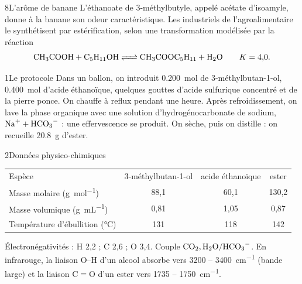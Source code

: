 

\begin{exoBac}{8}{L'arôme de banane}
L'éthanoate de 3-méthylbutyle, appelé acétate d'isoamyle, donne à la banane son odeur caractéristique. Les industriels
de l'agroalimentaire le synthétisent par estérification, selon une transformation modélisée par la réaction
\[\ce{CH3COOH + C5H11OH <=> CH3COOC5H11 + H2O}\qquad K=4{,}0.\]
\begin{center}
\qquad\qquad
{}\par\smallskip
{}
\end{center}
\begin{docu}{1}{Le protocole}
Dans un ballon, on introduit \qty{0,200}{mol} de 3-méthylbutan-1-ol, \qty{0,400}{mol} d'acide éthanoïque, quelques gouttes d'acide
sulfurique concentré et de la pierre ponce. On chauffe à reflux pendant une heure. Après refroidissement, on lave la phase
organique avec une solution d'hydrogénocarbonate de sodium, $\ce{Na+}+\ce{HCO3-}$ : une effervescence se produit. On sèche,
puis on distille : on recueille \qty{20,8}{g} d'ester.
\end{docu}
\begin{docu}{2}{Données physico-chimiques}
{\small\begin{tabular}{@{}lccc@{}}
Espèce & 3-méthylbutan-1-ol & acide éthanoïque & ester \\
Masse molaire (\unit{g.mol^{-1}}) & 88,1 & 60,1 & 130,2 \\
Masse volumique (\unit{g.mL^{-1}}) & 0,81 & 1,05 & 0,87 \\
Température d'ébullition (\unit{\degreeCelsius}) & 131 & 118 & 142 \\
\end{tabular}}\par\smallskip
Électronégativités : H 2,2 ; C 2,6 ; O 3,4. Couple $\ce{CO2},\ce{H2O}/\ce{HCO3-}$. En infrarouge, la liaison O--H d'un alcool absorbe
vers 3200 -- \qty{3400}{cm^{-1}} (bande large) et la liaison C$=$O d'un ester vers 1735 -- \qty{1750}{cm^{-1}}.

\end{docu}
\end{exoBac}
